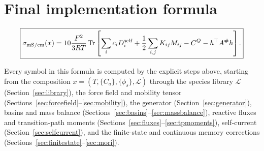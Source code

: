 \documentclass[11pt]{article}
\newcommand{\Tr}{\operatorname{Tr}}
\begin{document}
\section{Final implementation formula}

\[
\boxed{
\sigma_{\rm mS/cm}(x)
=
10\frac{F^2}{3RT}
\Tr
\left[
\sum_i c_iD_i^{\rm self}
+
\frac12\sum_{i,j}K_{ij}M_{ij}
-
C^Q
-
h^\top A^\#h
\right].
}
\]

Every symbol in this formula is computed by the explicit steps above, starting
from the composition \(x=(T,\{C_a\},\{\phi_s\},\mathcal L)\) through the
species library \(\mathcal L\) (Section~\ref{sec:library}), the force field
and mobility tensor (Sections~\ref{sec:forcefield}--\ref{sec:mobility}), the
generator (Section~\ref{sec:generator}), basins and mass balance
(Sections~\ref{sec:basins}--\ref{sec:massbalance}), reactive fluxes and
transition-path moments (Sections~\ref{sec:fluxes}--\ref{sec:tpmoments}),
self-current (Section~\ref{sec:selfcurrent}), and the finite-state and
continuous memory corrections (Sections~\ref{sec:finitestate}--\ref{sec:mori}).
\end{document}

